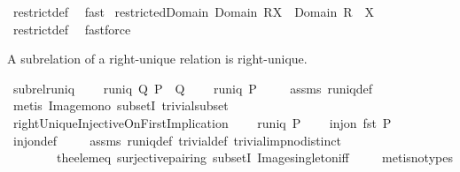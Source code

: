 \begin{isabellebody}
%
\isatagproof
{}\isamarkupfalse%
\ restrict{\isacharunderscore}def\ \isamarkupfalse%
\ fast%
\endisatagproof
{\isafoldproof}%
%
\isadelimproof
\isanewline
%
\endisadelimproof
\isanewline
{}\isamarkupfalse%
\ restrictedDomain{\isacharcolon}\ {\isachardoublequoteopen}Domain\ {\isacharparenleft}R{\isacharbar}{\isacharbar}X{\isacharparenright}\ {\isacharequal}\ Domain\ R\ {\isasyminter}\ X{\isachardoublequoteclose}\ \isanewline
%
\isadelimproof
\ \ %
\endisadelimproof
%
\isatagproof
{}\isamarkupfalse%
\ restrict{\isacharunderscore}def\ \isamarkupfalse%
\ fastforce%
\endisatagproof
{\isafoldproof}%
%
\isadelimproof
%
\endisadelimproof
%
\begin{isamarkuptext}%
A subrelation of a right-unique relation is right-unique.%
\end{isamarkuptext}%
\isamarkuptrue%
\isamarkupfalse%
\ subrel{\isacharunderscore}runiq{\isacharcolon}\ \isanewline
\ \ \ {\isachardoublequoteopen}runiq\ Q{\isachardoublequoteclose}\ {\isachardoublequoteopen}P\ {\isasymsubseteq}\ Q{\isachardoublequoteclose}\ \isanewline
\ \ \ {\isachardoublequoteopen}runiq\ P{\isachardoublequoteclose}\ \isanewline
%
\isadelimproof
\ \ %
\endisadelimproof
%
\isatagproof
{}\isamarkupfalse%
\ assms\ runiq{\isacharunderscore}def\ \isamarkupfalse%
\ {\isacharparenleft}metis\ Image{\isacharunderscore}mono\ subsetI\ trivial{\isacharunderscore}subset{\isacharparenright}%
\endisatagproof
{\isafoldproof}%
%
\isadelimproof
\isanewline
%
\endisadelimproof
\isanewline
{}\isamarkupfalse%
\ rightUniqueInjectiveOnFirstImplication{\isacharcolon}\ \isanewline
\ \ \ {\isachardoublequoteopen}runiq\ P{\isachardoublequoteclose}\ \isanewline
\ \ \ {\isachardoublequoteopen}inj{\isacharunderscore}on\ fst\ P{\isachardoublequoteclose}\ \isanewline
%
\isadelimproof
\ \ %
\endisadelimproof
%
\isatagproof
{}\isamarkupfalse%
\ inj{\isacharunderscore}on{\isacharunderscore}def\ \isanewline
\ \ \isamarkupfalse%
\ assms\ runiq{\isacharunderscore}def\ trivial{\isacharunderscore}def\ trivial{\isacharunderscore}imp{\isacharunderscore}no{\isacharunderscore}distinct\ \isanewline
\ \ \ \ \ \ \ \ the{\isacharunderscore}elem{\isacharunderscore}eq\ surjective{\isacharunderscore}pairing\ subsetI\ Image{\isacharunderscore}singleton{\isacharunderscore}iff\ \isanewline
\ \ \isamarkupfalse%
\ {\isacharparenleft}metis{\isacharparenleft}no{\isacharunderscore}types{\isacharparenright}{\isacharparenright}%

\end{isabellebody}

